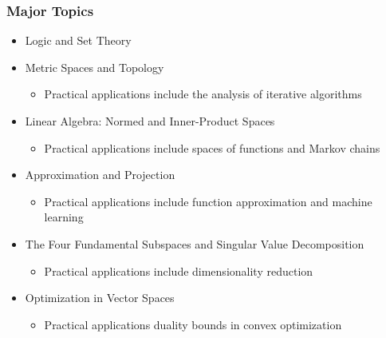 \documentclass[10pt,english,aspectratio=169]{beamer}
\begin{document}
\begin{frame} \frametitle{Major Topics}

\begin{itemize}
  \setlength\itemsep{4mm}
  \item Logic and Set Theory
  \item Metric Spaces and Topology
  \begin{itemize}
	  \item Practical applications include the analysis of iterative algorithms
  \end{itemize}  
  \item Linear Algebra: Normed and Inner-Product Spaces
  \begin{itemize}
	  \item Practical applications include spaces of functions and Markov chains
  \end{itemize}    
  \item Approximation and Projection
  \begin{itemize}
	  \item Practical applications include function approximation and machine learning
  \end{itemize}     
  \item The Four Fundamental Subspaces and Singular Value Decomposition
  \begin{itemize}
	  \item Practical applications include dimensionality reduction
  \end{itemize} 
  \item Optimization in Vector Spaces
  \begin{itemize}
	  \item Practical applications duality bounds in convex optimization
  \end{itemize} 
\end{itemize}

	
\end{frame}
\end{document}
